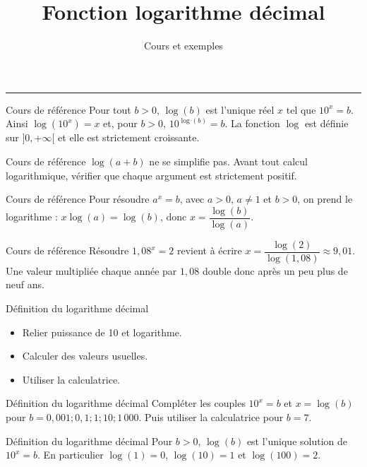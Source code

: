 \documentclass[aspectratio=169,10pt]{beamer}
\title{Fonction logarithme décimal}
\subtitle{Cours et exemples}
\date{}
\author{}
\begin{document}
\begin{frame}[plain]
\vfill
{\inserttitle\par}
\medskip
{\insertsubtitle\par}
\medskip
{\rule{\textwidth}{.5pt}}
\vfill
\end{frame}
\begin{frame}{Cours de référence}
Pour tout \(b>0\), \(\log(b)\) est l'unique réel \(x\) tel que \(10^x=b\). Ainsi \(\log(10^x)=x\) et, pour \(b>0\), \(10^{\log(b)}=b\). La fonction \(\log\) est définie sur \(]0,+\infty[\) et elle est strictement croissante.
\end{frame}
\begin{frame}{Cours de référence}
\(\log(a+b)\) ne se simplifie pas. Avant tout calcul logarithmique, vérifier que chaque argument est strictement positif.
\end{frame}
\begin{frame}{Cours de référence}
Pour résoudre \(a^x=b\), avec \(a>0\), \(a\neq1\) et \(b>0\), on prend le logarithme : \(x\log(a)=\log(b)\), donc \(x=\dfrac{\log(b)}{\log(a)}\).
\end{frame}
\begin{frame}{Cours de référence}
Résoudre \(1{,}08^x=2\) revient à écrire \(x=\dfrac{\log(2)}{\log(1{,}08)}\approx9{,}01\). Une valeur multipliée chaque année par \(1{,}08\) double donc après un peu plus de neuf ans.
\end{frame}
\begin{frame}{Définition du logarithme décimal}
\begin{itemize}
\item Relier puissance de 10 et logarithme.
\item Calculer des valeurs usuelles.
\item Utiliser la calculatrice.

\end{itemize}
\end{frame}
\begin{frame}{Définition du logarithme décimal}
Compléter les couples \(10^x=b\) et \(x=\log(b)\) pour \(b=0{,}001;0{,}1;1;10;1\,000\). Puis utiliser la calculatrice pour \(b=7\).
\end{frame}
\begin{frame}{Définition du logarithme décimal}
Pour \(b>0\), \(\log(b)\) est l'unique solution de \(10^x=b\). En particulier \(\log(1)=0\), \(\log(10)=1\) et \(\log(100)=2\).
\end{frame}
\end{document}
